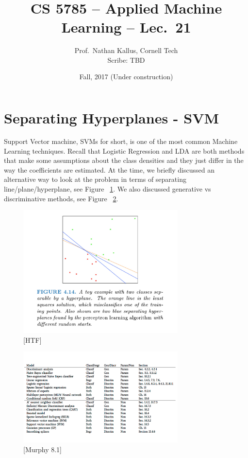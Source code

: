 \documentclass[a4paper]{article}
\title{CS 5785 -- Applied Machine Learning -- Lec.\ 21}
\author{Prof.\ Nathan Kallus, Cornell Tech\\Scribe: TBD}
\date{Fall, 2017 (Under construction)}
\begin{document}
\maketitle

\section{Separating Hyperplanes - SVM}
Support Vector machine, SVMs for short, is one of the most common Machine Learning techniques. Recall that Logistic Regression and LDA are both methods that make some assumptions about the class densities and they just differ in the way the coefficients are estimated. At the time, we briefly discussed an alternative way to look at the problem in terms of separating line/plane/hyperplane, see Figure ~\ref{fig:414}. We also discussed generative vs discriminative methods, see Figure ~\ref{fig:murphyTable}. \\

\begin{figure}
\centering
\includegraphics[width=0.75\textwidth]{fig414.png}
\caption{\label{fig:414}[HTF]}
\end{figure}

\begin{figure}
\centering
\includegraphics[width=0.75\textwidth]{murphyTable81.png}
\caption{\label{fig:murphyTable}[Murphy 8.1]}
\end{figure}
\end{document}
